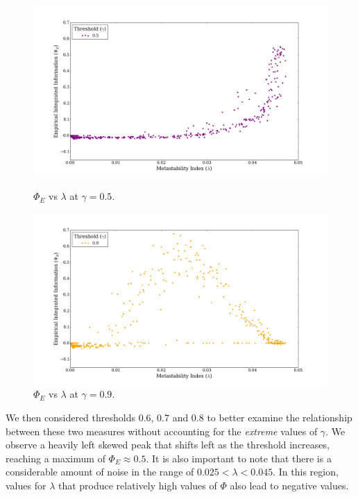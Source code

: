 \documentclass[a4paper,11pt]{article}
\begin{document}
\begin{figure}[H] 
	\label{fig:phi-vs-lambda-extremes} 
	\begin{minipage}[b]{0.5\linewidth}
		\begin{center}
		\includegraphics[scale = 0.2]{figures/phi_vs_lambda_5}
		\caption{
			$\Phi_E$ vs $\lambda$ at $\gamma = 0.5$.
			\label{fig:phi_vs_lambda_5}
		}
		\end{center}
		\vspace{2ex}
	\end{minipage}
	\begin{minipage}[b]{0.5\linewidth}
		\begin{center}
		\includegraphics[scale = 0.2]{figures/phi_vs_lambda_9}
		\caption{
			$\Phi_E$ vs $\lambda$ at $\gamma = 0.9$.
			\label{fig:phi_vs_lambda_9}
		}
		\end{center}
		\vspace{2ex}
	\end{minipage}
\end{figure}

We then considered thresholds 0.6, 0.7 and 0.8 to better examine the relationship between these two measures without accounting for the \textit{extreme} values of $\gamma$. We observe a heavily left skewed peak that shifts left as the threshold increases, reaching a maximum of $\Phi_E \approx 0.5$. It is also important to note that there is a considerable amount of noise in the range of $0.025 < \lambda < 0.045$. In this region, values for $\lambda$ that produce relatively high values of $\Phi$ also lead to negative values.
\end{document}
